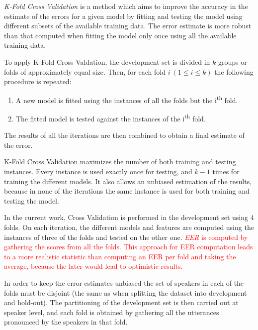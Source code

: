 \textit{K-Fold Cross Validation} \cite{svm_jwht}
is a method which aims to improve the accuracy in the
estimate of the errors for a given model by fitting and testing the model using different
subsets of the available training data. The error estimate is more robust than
that computed when fitting the model only once using all the available training data.

To apply K-Fold Cross Valdation,
the development set is divided in $k$ groups or folds of approximately equal size.
Then, for each fold $i \ (1 \leq i \leq k)$ the following procedure is repeated:

\begin{enumerate}
  \item A new model is fitted using the instances of all the folds but the i\textsuperscript{th} fold.
  \item The fitted model is tested against the instances of the i\textsuperscript{th} fold.
\end{enumerate}

The results of all the iterations are then combined to obtain a final estimate of the error.

K-Fold Cross Validation maximizes the number of both training and testing instances.
Every instance is used exactly once for testing, and $k-1$ times for training the different
models. It also allows an unbiased estimation of the results,
because in none of the iterations the same instance is used for both training and testing the
model.

In the current work, Cross Validation is performed in the development set using 4 folds.
On each iteration, the different models and features are computed using the instances of
three of the folds and tested on the other one.
\textcolor{red}{
  \textit{EER} is computed by gathering the scores from all the folds.
  This approach for EER computation leads to a more realistic statistic than computing an EER
  per fold and taking the average, because the later would lead to optimistic results.
}

In order to keep the error estimates unbiased
the set of speakers in each of the folds must be disjoint (the same as
when splitting the dataset into development and hold-out).
The partitioning of the development set
is then carried out at speaker level, and each fold is obtained by gathering all the
utterances pronounced by the speakers in that fold.